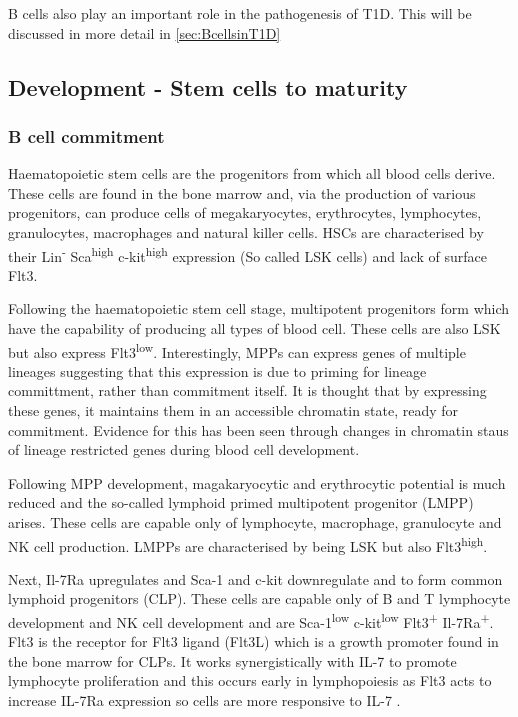 B cells also play an important role in the pathogenesis of T1D. 
This will be discussed in more detail in \cref{sec:BcellsinT1D}

\subsection{Development - Stem cells to maturity}
\label{subsec:Bcelldevelopment}
\subsubsection{B cell commitment}

Haematopoietic stem cells are the progenitors from which all blood cells derive.
These cells are found in the bone marrow and, via the production of various progenitors, can produce cells of megakaryocytes, erythrocytes, lymphocytes, granulocytes, macrophages and natural killer cells.
HSCs are characterised by their Lin\textsuperscript{-} Sca\textsuperscript{high} c-kit\textsuperscript{high} expression (So called LSK cells) and lack of surface Flt3\citep{Welinder2011}.

Following the haematopoietic stem cell stage, multipotent progenitors form which have the capability of producing all types of blood cell.
These cells are also LSK but also express Flt3\textsuperscript{low}\citep{Welinder2011}.
Interestingly, MPPs can express genes of multiple lineages \citep{Hu1997} suggesting that this expression is due to priming for lineage committment, rather than commitment itself.
It is thought that by expressing these genes, it maintains them in an accessible chromatin state, ready for commitment\citep{Welinder2011}.
Evidence for this has been seen through changes in chromatin staus of lineage restricted genes during blood cell development\citep{Weishaupt2010}.

Following MPP development, magakaryocytic and erythrocytic potential is much reduced and the so-called lymphoid primed multipotent progenitor (LMPP) arises.
These cells are capable only of lymphocyte, macrophage, granulocyte and NK cell production\citep{Adolfsson2005}.
LMPPs are characterised by being LSK but also Flt3\textsuperscript{high}.

Next, Il-7Ra upregulates and Sca-1 and c-kit downregulate and to form common lymphoid progenitors (CLP).
These cells are capable only of B and T lymphocyte development and NK cell development \citep{Kondo1997} and are Sca-1\textsuperscript{low} c-kit\textsuperscript{low} Flt3\textsuperscript{+} Il-7Ra\textsuperscript{+}.
Flt3 is the receptor for Flt3 ligand (Flt3L) which is a growth promoter found in the bone marrow for CLPs.
It works synergistically with IL-7 to promote lymphocyte proliferation and this occurs early in lymphopoiesis as Flt3 acts to increase IL-7Ra expression so cells are more responsive to IL-7 \citep{Holmes2006}.

